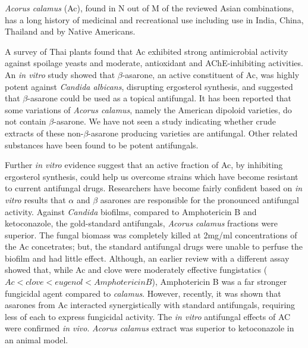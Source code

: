 \documentclass[twocolumn]{article}
\begin{document}
\textit{Acorus calamus} (Ac),
found in N out of M of the reviewed Asian combinations,
has a long history of medicinal and recreational use
including use in India, China, Thailand and by Native Americans.
\cite{phongpaichit2005antimicrobial}

A survey of Thai plants found that Ac
exhibited strong antimicrobial activity against spoilage yeasts
and moderate, antioxidant and AChE-inhibiting activities.
\cite{nanasombat2014antimicrobial}
An \textit{in vitro} study showed that $\beta$-asarone,
an active constituent of Ac,
was highly potent against \textit{Candida albicans},
disrupting ergosterol synthesis,
and suggested that $\beta$-asarone could be used as a topical
antifungal.
\cite{rajput2013beta}
It has been reported that some variations of \textit{Acorus calamus},
namely the American dipoloid varieties,
do not contain $\beta$-asarone.
\cite{phongpaichit2005antimicrobial}
We have not seen a study indicating whether crude extracts
of these non-$\beta$-asarone producing varieties are antifungal.
Other related substances have been found to be potent antifungals.
\cite{rajput2013anti}

Further \textit{in vitro} evidence suggest that
an active fraction of Ac,
by inhibiting ergosterol synthesis,
could help us overcome strains which have become
resistant to current antifungal drugs.
\cite{subha2008effect}
Researchers have become fairly confident based on \textit{in vitro}
results that $\alpha$ and $\beta$ asarones are responsible for
the pronounced antifungal activity.
\cite{devi2009antimicrobial}
Against \textit{Candida} biofilms,
compared to Amphotericin B and ketoconazole, the gold-standard antifungals,
\textit{Acorus calamus} fractions were superior.
The fungal biomass was completely killed at 2mg/ml concentrations
of the Ac concetrates; but, the standard antifungal drugs
were unable to perfuse the biofilm and had little effect.
\cite{subha2009candida}
Although, an earlier review with a different assay
showed that, while Ac and clove were moderately effective fungistatics
($Ac < clove < eugenol < Amphotericin B$),
Amphotericin B was a far stronger fungicidal agent
compared to \textit{calamus}.
\cite{thirach2003antifungal}
However, recently,
it was shown that asarones from Ac interacted
synergistically with standard antifungals,
requiring less of each to express fungicidal activity.
\cite{kumar2015asarones}
The \textit{in vitro} antifungal effects of AC
were confirmed \textit{in vivo}.
\textit{Acorus calamus} extract
was superior to ketoconazole in an animal model.
\cite{subha2009combating}
\end{document}
